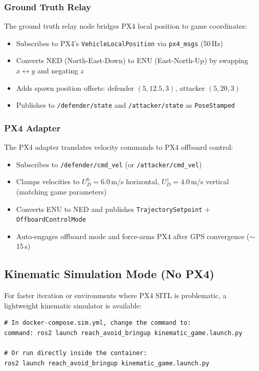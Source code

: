 \documentclass[11pt,a4paper]{article}
\begin{document}
\subsubsection{Ground Truth Relay}

The ground truth relay node bridges PX4 local position to game coordinates:

\begin{itemize}[noitemsep]
    \item Subscribes to PX4's \texttt{VehicleLocalPosition} via \texttt{px4\_msgs} (50\,Hz)
    \item Converts NED (North-East-Down) to ENU (East-North-Up) by swapping $x \leftrightarrow y$ and negating $z$
    \item Adds spawn position offsets: defender $(5, 12.5, 3)$, attacker $(5, 20, 3)$
    \item Publishes to \texttt{/defender/state} and \texttt{/attacker/state} as \texttt{PoseStamped}
\end{itemize}

\subsubsection{PX4 Adapter}

The PX4 adapter translates velocity commands to PX4 offboard control:

\begin{itemize}[noitemsep]
    \item Subscribes to \texttt{/defender/cmd\_vel} (or \texttt{/attacker/cmd\_vel})
    \item Clamps velocities to $U_D^h = 6.0$\,m/s horizontal, $U_D^z = 4.0$\,m/s vertical (matching game parameters)
    \item Converts ENU to NED and publishes \texttt{TrajectorySetpoint} + \texttt{OffboardControlMode}
    \item Auto-engages offboard mode and force-arms PX4 after GPS convergence ($\sim$15\,s)
\end{itemize}

\subsection{Kinematic Simulation Mode (No PX4)}

For faster iteration or environments where PX4 SITL is problematic, a lightweight kinematic simulator is available:

\begin{lstlisting}[style=bashstyle]
# In docker-compose.sim.yml, change the command to:
command: ros2 launch reach_avoid_bringup kinematic_game.launch.py

# Or run directly inside the container:
ros2 launch reach_avoid_bringup kinematic_game.launch.py
\end{lstlisting}
\end{document}

